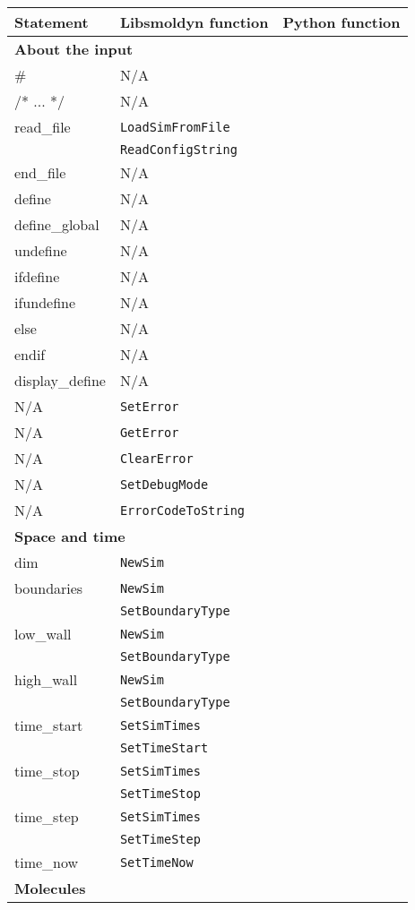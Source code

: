 \documentclass {book}
\newcommand {\ttt} {\texttt}
\begin{document}
\begin{longtable}[c]{lll}
Statement & Libsmoldyn function & Python function\\
\hline
\multicolumn{3}{l}{\hspace{0.3in}\textbf{About the input}}\\
\hline
\# & N/A\\
/* ... */ & N/A\\
read\_file & \ttt{LoadSimFromFile}\\
& \ttt{ReadConfigString}\\
end\_file & N/A\\
define & N/A\\
define\_global & N/A\\
undefine & N/A\\
ifdefine & N/A\\
ifundefine & N/A\\
else & N/A\\
endif & N/A\\
display\_define & N/A\\
N/A & \ttt{SetError}\\
N/A & \ttt{GetError}\\
N/A & \ttt{ClearError}\\
N/A & \ttt{SetDebugMode}\\
N/A & \ttt{ErrorCodeToString}\\
\hline
\multicolumn{3}{l}{\hspace{0.3in}\textbf{Space and time}}\\
\hline
dim & \ttt{NewSim}\\
boundaries & \ttt{NewSim}\\
& \ttt{SetBoundaryType}\\
low\_wall & \ttt{NewSim}\\
& \ttt{SetBoundaryType}\\
high\_wall & \ttt{NewSim}\\
& \ttt{SetBoundaryType}\\
time\_start & \ttt{SetSimTimes}\\
& \ttt{SetTimeStart}\\
time\_stop & \ttt{SetSimTimes}\\
& \ttt{SetTimeStop}\\
time\_step & \ttt{SetSimTimes}\\
& \ttt{SetTimeStep}\\
time\_now & \ttt{SetTimeNow}\\
\hline
\multicolumn{3}{l}{\hspace{0.3in}\textbf{Molecules}}\\

\end{longtable}
\end{document}
